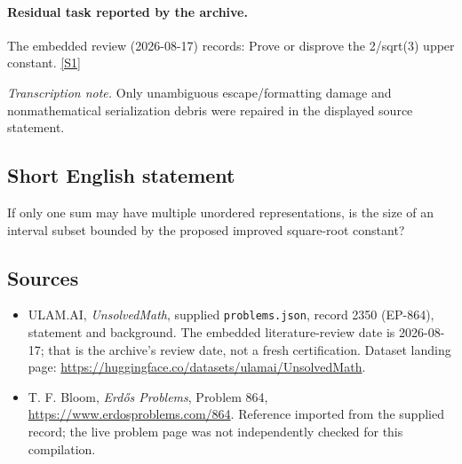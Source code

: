 \documentclass[11pt,a4paper]{article}
\newcommand{\sref}[2]{\hyperlink{source:#1:#2}{[S#2]}}
\begin{document}
\paragraph{Residual task reported by the archive.}

The embedded review (2026-08-17) records: Prove or disprove the 2/sqrt(3) upper constant. \sref{2350}{1}

{\small\emph{Transcription note.} Only unambiguous escape/formatting damage and nonmathematical serialization debris were repaired in the displayed source statement.}

\subsection{Short English statement}

If only one sum may have multiple unordered representations, is the size of an interval subset bounded by the proposed improved square-root constant?

\subsection{Sources}

{\small

\begin{itemize}

\item[\hypertarget{source:2350:1}{S1}] ULAM.AI, \emph{UnsolvedMath}, supplied \texttt{problems.json}, record 2350 (EP-864), statement and background. The embedded literature-review date is 2026-08-17; that is the archive’s review date, not a fresh certification. Dataset landing page: \url{https://huggingface.co/datasets/ulamai/UnsolvedMath}.

\item[\hypertarget{source:2350:2}{S2}] T. F. Bloom, \emph{Erdős Problems}, Problem 864, \url{https://www.erdosproblems.com/864}. Reference imported from the supplied record; the live problem page was not independently checked for this compilation.

\end{itemize}

}

\label{end:2350}
\end{document}
